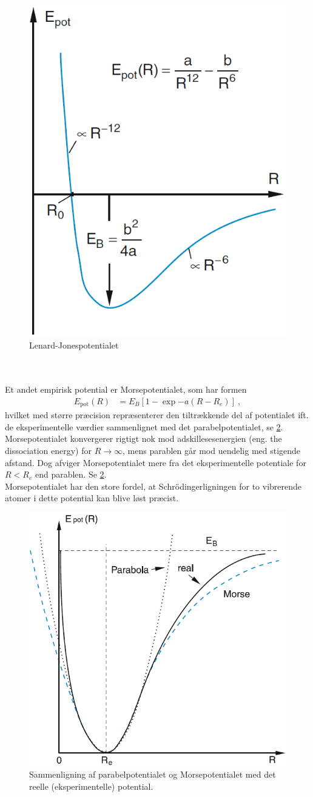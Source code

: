 \begin{figure}[!h]
    \centering
    \includegraphics[width=.45\textwidth]{Q19/images/LenardJonesPotential.PNG}
    \caption{Lenard-Jonespotentialet}
    \label{fig:Q19_LenardJonesPotential}
\end{figure}\newpage
$ $\\\\

Et andet empirisk potential er \textsf{Morsepotentialet}, som har formen
\begin{align}
    E_\text{pot}(R) &= E_B \left[1 - \exp{-a(R-R_e)}\right] \: ,
\end{align}
hvilket med større præcision repræsenterer den tiltrækkende del af potentialet ift. de eksperimentelle værdier sammenlignet med det parabelpotentialet, se \cref{fig:Q19_MorsePotential}. Morsepotentialet konvergerer rigtigt nok mod adskillesesenergien (eng. the dissociation energy) for $R \rightarrow \infty$, mens parablen går mod uendelig med stigende afstand. Dog afviger Morsepotentialet mere fra det eksperimentelle potentiale for $R < R_e$ end parablen. Se \cref{fig:Q19_MorsePotential}.\\

Morsepotentialet har den store fordel, at Schrödingerligningen for to vibrerende atomer i dette potential kan blive løst præcist.

\begin{figure}[!h]
    \centering
    \includegraphics[width=.65\textwidth]{Q19/images/MorsePotentialComparisonWithOtherPotentials.PNG}
    \caption{Sammenligning af parabelpotentialet og Morsepotentialet med det reelle (eksperimentelle) potential.}
    \label{fig:Q19_MorsePotential}
\end{figure}